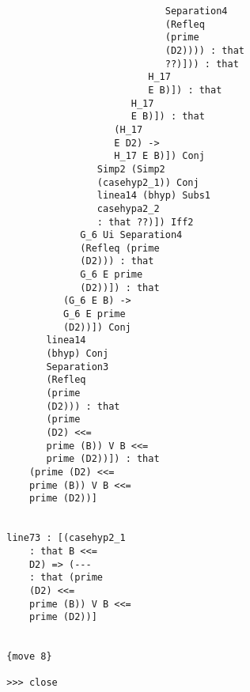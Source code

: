 \documentclass[12pt]{article}
\begin{document}
\begin{verbatim}
                                                       Separation4 
                                                       (Refleq 
                                                       (prime 
                                                       (D2)))) : that 
                                                       ??)])) : that 
                                                    H_17 
                                                    E B)]) : that 
                                                 H_17 
                                                 E B)]) : that 
                                              (H_17 
                                              E D2) -> 
                                              H_17 E B)]) Conj 
                                           Simp2 (Simp2 
                                           (casehyp2_1)) Conj 
                                           linea14 (bhyp) Subs1 
                                           casehypa2_2 
                                           : that ??)]) Iff2 
                                        G_6 Ui Separation4 
                                        (Refleq (prime 
                                        (D2))) : that 
                                        G_6 E prime 
                                        (D2))]) : that 
                                     (G_6 E B) -> 
                                     G_6 E prime 
                                     (D2))]) Conj 
                                  linea14 
                                  (bhyp) Conj 
                                  Separation3 
                                  (Refleq 
                                  (prime 
                                  (D2))) : that 
                                  (prime 
                                  (D2) <<= 
                                  prime (B)) V B <<= 
                                  prime (D2))]) : that 
                               (prime (D2) <<= 
                               prime (B)) V B <<= 
                               prime (D2))]


                           line73 : [(casehyp2_1 
                               : that B <<= 
                               D2) => (--- 
                               : that (prime 
                               (D2) <<= 
                               prime (B)) V B <<= 
                               prime (D2))]


                           {move 8}

                           >>> close



\end{verbatim}
\end{document}

